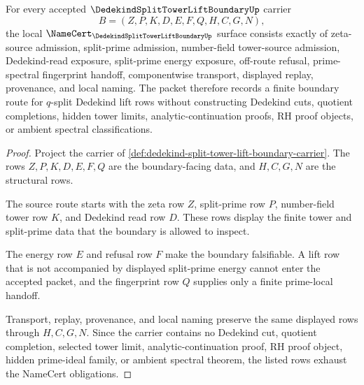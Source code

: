 \begin{theorem}
\label{thm:dedekind-split-tower-lift-boundary-namecert-obligations}
For every accepted $\DedekindSplitTowerLiftBoundaryUp$ carrier
$$
B=(Z,P,K,D,E,F,Q,H,C,G,N),
$$
the local $\NameCert_{\DedekindSplitTowerLiftBoundaryUp}$ surface consists exactly of zeta-source admission, split-prime admission, number-field tower-source admission, Dedekind-read exposure, split-prime energy exposure, off-route refusal, prime-spectral fingerprint handoff, componentwise transport, displayed replay, provenance, and local naming. The packet therefore records a finite boundary route for $q$-split Dedekind lift rows without constructing Dedekind cuts, quotient completions, hidden tower limits, analytic-continuation proofs, RH proof objects, or ambient spectral classifications.
\end{theorem}
\begin{proof}
Project the carrier of \autoref{def:dedekind-split-tower-lift-boundary-carrier}. The rows $Z,P,K,D,E,F,Q$ are the boundary-facing data, and $H,C,G,N$ are the structural rows.

The source route starts with the zeta row $Z$, split-prime row $P$, number-field tower row $K$, and Dedekind read row $D$. These rows display the finite tower and split-prime data that the boundary is allowed to inspect.

The energy row $E$ and refusal row $F$ make the boundary falsifiable. A lift row that is not accompanied by displayed split-prime energy cannot enter the accepted packet, and the fingerprint row $Q$ supplies only a finite prime-local handoff.

Transport, replay, provenance, and local naming preserve the same displayed rows through $H,C,G,N$. Since the carrier contains no Dedekind cut, quotient completion, selected tower limit, analytic-continuation proof, RH proof object, hidden prime-ideal family, or ambient spectral theorem, the listed rows exhaust the NameCert obligations.
\end{proof}

